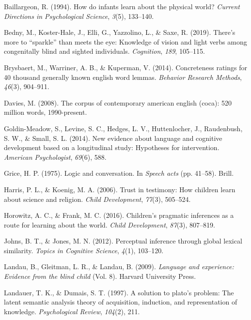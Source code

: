 \documentclass[10pt, letterpaper]{article}
\begin{document}
\hypertarget{refs}{}
\leavevmode\hypertarget{ref-baillargeon1994}{}%
Baillargeon, R. (1994). How do infants learn about the physical world?
\emph{Current Directions in Psychological Science}, \emph{3}(5),
133--140.

\leavevmode\hypertarget{ref-bedny2019}{}%
Bedny, M., Koster-Hale, J., Elli, G., Yazzolino, L., \& Saxe, R. (2019).
There's more to ``sparkle'' than meets the eye: Knowledge of vision and
light verbs among congenitally blind and sighted individuals.
\emph{Cognition}, \emph{189}, 105--115.

\leavevmode\hypertarget{ref-brysbaert2014}{}%
Brysbaert, M., Warriner, A. B., \& Kuperman, V. (2014). Concreteness
ratings for 40 thousand generally known english word lemmas.
\emph{Behavior Research Methods}, \emph{46}(3), 904--911.

\leavevmode\hypertarget{ref-davies2008}{}%
Davies, M. (2008). The corpus of contemporary american english (coca):
520 million words, 1990-present.

\leavevmode\hypertarget{ref-goldin-meadow2014}{}%
Goldin-Meadow, S., Levine, S. C., Hedges, L. V., Huttenlocher, J.,
Raudenbush, S. W., \& Small, S. L. (2014). New evidence about language
and cognitive development based on a longitudinal study: Hypotheses for
intervention. \emph{American Psychologist}, \emph{69}(6), 588.

\leavevmode\hypertarget{ref-grice1975}{}%
Grice, H. P. (1975). Logic and conversation. In \emph{Speech acts} (pp.
41--58). Brill.

\leavevmode\hypertarget{ref-harris2006}{}%
Harris, P. L., \& Koenig, M. A. (2006). Trust in testimony: How children
learn about science and religion. \emph{Child Development},
\emph{77}(3), 505--524.

\leavevmode\hypertarget{ref-horowitz2016}{}%
Horowitz, A. C., \& Frank, M. C. (2016). Children's pragmatic inferences
as a route for learning about the world. \emph{Child Development},
\emph{87}(3), 807--819.

\leavevmode\hypertarget{ref-johns2012}{}%
Johns, B. T., \& Jones, M. N. (2012). Perceptual inference through
global lexical similarity. \emph{Topics in Cognitive Science},
\emph{4}(1), 103--120.

\leavevmode\hypertarget{ref-landau2009}{}%
Landau, B., Gleitman, L. R., \& Landau, B. (2009). \emph{Language and
experience: Evidence from the blind child} (Vol. 8). Harvard University
Press.

\leavevmode\hypertarget{ref-landauer1997}{}%
Landauer, T. K., \& Dumais, S. T. (1997). A solution to plato's problem:
The latent semantic analysis theory of acquisition, induction, and
representation of knowledge. \emph{Psychological Review}, \emph{104}(2),
211.
\end{document}
